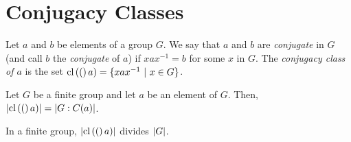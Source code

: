 \section{Conjugacy Classes}

\begin{definition}
	Let $a$ and $b$ be elements of a group $G$. We say that $a$ and $b$ are \textit{conjugate} in $G$ (and call $b$ the \textit{conjugate} of $a$) if $xax^{-1}=b$ for some $x$ in $G$. The \textit{conjugacy class of $a$} is the set $\text{cl}\left((\right)a) = \{xax^{-1}\ \vert\ x \in G\}$.
\end{definition}

\begin{theorem}
	Let $G$ be a finite group and let $a$ be an element of $G$. Then, $\left\lvert \text{cl}\left((\right)a) \right\rvert = \left\lvert G:C(a) \right\rvert$.
\end{theorem}

\begin{corollary}
	In a finite group, $\left\lvert \text{cl}\left((\right)a) \right\rvert$ divides $\left\lvert G \right\rvert$.
\end{corollary}
